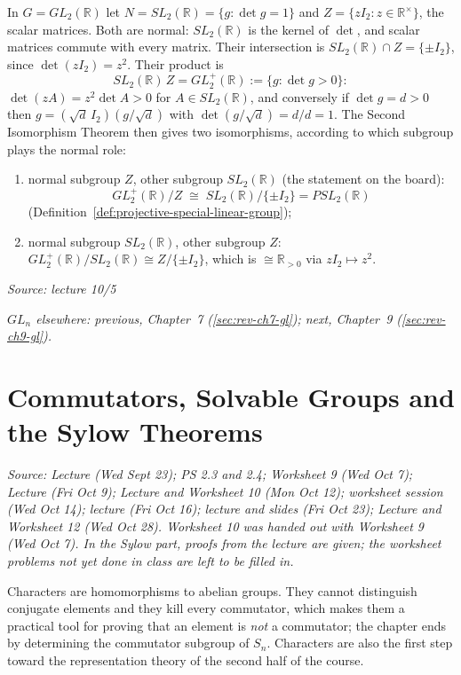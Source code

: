 \documentclass[11pt]{report}
\newcommand{\srcline}[1]{\par\hfill{\footnotesize\textit{Source: #1}}}
\begin{document}
\begin{exbox}\label{ex:gl2-plus-scalars}
In $G = GL_2(\mathbb{R})$ let $N = SL_2(\mathbb{R}) = \{g : \det g = 1\}$ and $Z = \{zI_2 : z \in \mathbb{R}^\times\}$, the scalar matrices. Both are normal: $SL_2(\mathbb{R})$ is the kernel of $\det$, and scalar matrices commute with every matrix. Their intersection is $SL_2(\mathbb{R}) \cap Z = \{\pm I_2\}$, since $\det(zI_2) = z^2$. Their product is
\[ SL_2(\mathbb{R})\,Z = GL_2^+(\mathbb{R}) := \{g : \det g > 0\}: \]
$\det(zA) = z^2 \det A > 0$ for $A \in SL_2(\mathbb{R})$, and conversely if $\det g = d > 0$ then $g = (\sqrt{d}\,I_2)(g/\sqrt{d})$ with $\det(g/\sqrt{d}) = d/d = 1$. The Second Isomorphism Theorem then gives two isomorphisms, according to which subgroup plays the normal role:
\begin{enumerate}[nosep]
    \item normal subgroup $Z$, other subgroup $SL_2(\mathbb{R})$ (the statement on the board):
    \[ GL_2^+(\mathbb{R})/Z \;\cong\; SL_2(\mathbb{R})/\{\pm I_2\} = PSL_2(\mathbb{R}) \]
(Definition~\ref{def:projective-special-linear-group});
    \item normal subgroup $SL_2(\mathbb{R})$, other subgroup $Z$: $GL_2^+(\mathbb{R})/SL_2(\mathbb{R}) \cong Z/\{\pm I_2\}$, which is $\cong \mathbb{R}_{>0}$ via $zI_2 \mapsto z^2$.
\end{enumerate}
\srcline{lecture 10/5}
\end{exbox}

\textit{$GL_n$ elsewhere: previous, Chapter~7 (\ref{sec:rev-ch7-gl}); next, Chapter~9 (\ref{sec:rev-ch9-gl}).}

\chapter{Commutators, Solvable Groups and the Sylow Theorems}\label{ch:characters}

\textit{Source: Lecture (Wed Sept 23); PS 2.3 and 2.4; Worksheet 9 (Wed Oct 7); Lecture (Fri Oct 9); Lecture and Worksheet 10 (Mon Oct 12); worksheet session (Wed Oct 14); lecture (Fri Oct 16); lecture and slides (Fri Oct 23); Lecture and Worksheet 12 (Wed Oct 28). Worksheet 10 was handed out with Worksheet 9 (Wed Oct 7). In the Sylow part, proofs from the lecture are given; the worksheet problems not yet done in class are left to be filled in.}

Characters are homomorphisms to abelian groups. They cannot distinguish conjugate elements and they kill every commutator, which makes them a practical tool for proving that an element is \emph{not} a commutator; the chapter ends by determining the commutator subgroup of $S_n$. Characters are also the first step toward the representation theory of the second half of the course.
\end{document}
